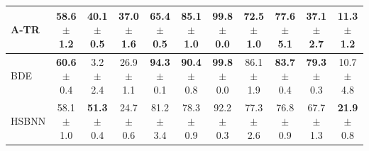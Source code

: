 \begin{table}[t]
\begin{tabular}{lcccccccccc}
\shortstack[l]{A-TR \\ {}} & \shortstack{58.6 \\ $\pm$ 1.2} & \shortstack{40.1 \\ $\pm$ 0.5} & \shortstack{37.0 \\ $\pm$ 1.6} & \shortstack{65.4 \\ $\pm$ 0.5} & \shortstack{85.1 \\ $\pm$ 1.0} & \shortstack{\textbf{99.8} \\ $\pm$ 0.0} & \shortstack{72.5 \\ $\pm$ 1.0} & \shortstack{77.6 \\ $\pm$ 5.1} & \shortstack{37.1 \\ $\pm$ 2.7} & \shortstack{11.3 \\ $\pm$ 1.2} \\
\midrule\midrule
\shortstack[l]{BDE \\ {}} & \shortstack{\textbf{60.6} \\ $\pm$ 0.4} & \shortstack{3.2 \\ $\pm$ 2.4} & \shortstack{26.9 \\ $\pm$ 1.1} & \shortstack{\textbf{94.3} \\ $\pm$ 0.1} & \shortstack{\textbf{90.4} \\ $\pm$ 0.8} & \shortstack{\textbf{99.8} \\ $\pm$ 0.0} & \shortstack{86.1 \\ $\pm$ 1.9} & \shortstack{\textbf{83.7} \\ $\pm$ 0.4} & \shortstack{\textbf{79.3} \\ $\pm$ 0.3} & \shortstack{10.7 \\ $\pm$ 4.8} \\
\midrule
\shortstack[l]{HSBNN \\ {}} & \shortstack{58.1 \\ $\pm$ 1.0} & \shortstack{\textbf{51.3} \\ $\pm$ 0.4} & \shortstack{24.7 \\ $\pm$ 0.6} & \shortstack{81.2 \\ $\pm$ 3.4} & \shortstack{78.3 \\ $\pm$ 0.9} & \shortstack{92.2 \\ $\pm$ 0.3} & \shortstack{77.3 \\ $\pm$ 2.6} & \shortstack{76.8 \\ $\pm$ 0.9} & \shortstack{67.7 \\ $\pm$ 1.3} & \shortstack{\textbf{21.9} \\ $\pm$ 0.8} \\

\end{tabular}
\end{table}
